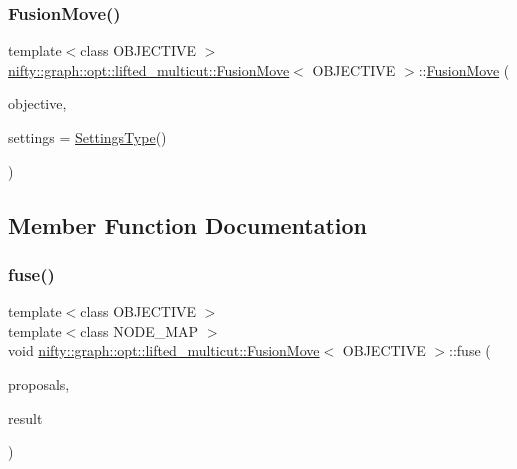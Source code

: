 \subsubsection{\texorpdfstring{Fusion\+Move()}{FusionMove()}}
{\footnotesize\ttfamily template$<$class O\+B\+J\+E\+C\+T\+I\+VE $>$ \\
\hyperlink{classnifty_1_1graph_1_1opt_1_1lifted__multicut_1_1FusionMove}{nifty\+::graph\+::opt\+::lifted\+\_\+multicut\+::\+Fusion\+Move}$<$ O\+B\+J\+E\+C\+T\+I\+VE $>$\+::\hyperlink{classnifty_1_1graph_1_1opt_1_1lifted__multicut_1_1FusionMove}{Fusion\+Move} (\begin{DoxyParamCaption}\item[{const \hyperlink{classnifty_1_1graph_1_1opt_1_1lifted__multicut_1_1FusionMove_a1d10c7f91df1a4ef65d94e27126342d7}{Objective\+Type} \&}]{objective,  }\item[{const \hyperlink{structnifty_1_1graph_1_1opt_1_1lifted__multicut_1_1FusionMove_1_1SettingsType}{Settings\+Type} \&}]{settings = {\ttfamily \hyperlink{structnifty_1_1graph_1_1opt_1_1lifted__multicut_1_1FusionMove_1_1SettingsType}{Settings\+Type}()} }\end{DoxyParamCaption})\hspace{0.3cm}{\ttfamily [inline]}}



\subsection{Member Function Documentation}
\mbox{\label{classnifty_1_1graph_1_1opt_1_1lifted__multicut_1_1FusionMove_ad66c58d96b24e5aaff3e0d510fd2a550}} 
\subsubsection{\texorpdfstring{fuse()}{fuse()}\hspace{0.1cm}{\footnotesize\ttfamily [1/2]}}
{\footnotesize\ttfamily template$<$class O\+B\+J\+E\+C\+T\+I\+VE $>$ \\
template$<$class N\+O\+D\+E\+\_\+\+M\+AP $>$ \\
void \hyperlink{classnifty_1_1graph_1_1opt_1_1lifted__multicut_1_1FusionMove}{nifty\+::graph\+::opt\+::lifted\+\_\+multicut\+::\+Fusion\+Move}$<$ O\+B\+J\+E\+C\+T\+I\+VE $>$\+::fuse (\begin{DoxyParamCaption}\item[{std\+::initializer\+\_\+list$<$ const N\+O\+D\+E\+\_\+\+M\+AP $\ast$$>$}]{proposals,  }\item[{N\+O\+D\+E\+\_\+\+M\+AP $\ast$}]{result }\end{DoxyParamCaption})\hspace{0.3cm}{\ttfamily [inline]}}

